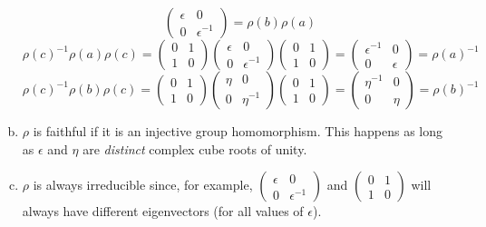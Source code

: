 \begin{solution}
\begin{enumerate}[(a)]
\[\begin{pmatrix}
            \epsilon & 0 \\
            0 & \epsilon^{-1}
        \end{pmatrix} =
        \rho(b) \rho(a)
    \]
    \[
        \rho(c)^{-1}\rho(a)\rho(c) = \begin{pmatrix}
            0 & 1 \\
            1 & 0
        \end{pmatrix} \begin{pmatrix}
            \epsilon & 0 \\
            0 & \epsilon^{-1}
        \end{pmatrix} \begin{pmatrix}
            0 & 1 \\
            1 & 0
        \end{pmatrix} = \begin{pmatrix}
            \epsilon^{-1} & 0 \\
            0 & \epsilon
        \end{pmatrix}
        = \rho(a)^{-1}
    \]
    \[
        \rho(c)^{-1}\rho(b)\rho(c) = \begin{pmatrix}
            0 & 1 \\
            1 & 0
        \end{pmatrix} \begin{pmatrix}
            \eta & 0 \\
            0 & \eta^{-1}
        \end{pmatrix} \begin{pmatrix}
            0 & 1 \\
            1 & 0
        \end{pmatrix} = \begin{pmatrix}
            \eta^{-1} & 0 \\
            0 & \eta
        \end{pmatrix}
        = \rho(b)^{-1}
    \]
    
    \item \(\rho\) is faithful if it is an injective group homomorphism. This happens as long as \(\epsilon\) and \(\eta\) are \emph{distinct} complex cube roots of unity.
    
    \item \(\rho\) is always irreducible since, for example,
    \(\begin{pmatrix}
        \epsilon & 0 \\
        0 & \epsilon^{-1}
    \end{pmatrix}\)
    and
    \(\begin{pmatrix}
        0 & 1 \\
        1 & 0
    \end{pmatrix}\)
    will always have different eigenvectors (for all values of \(\epsilon\)).
\end{enumerate}
\end{solution}

